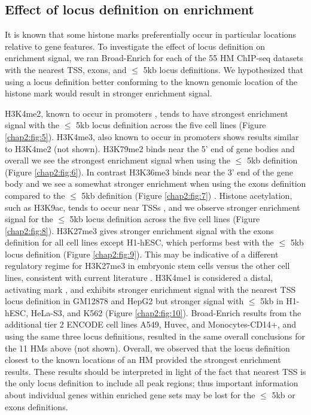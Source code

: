 \subsection{Effect of locus definition on enrichment}
\label{broad_results_locus}

It is known that some histone marks preferentially occur in particular locations relative to gene features. To investigate the effect of locus definition on enrichment signal, we ran Broad-Enrich for each of the 55 HM ChIP-seq datasets with the nearest TSS, exons, and $\leq$ 5kb locus definitions. We hypothesized that using a locus definition better conforming to the known genomic location of the histone mark would result in stronger enrichment signal.

H3K4me2, known to occur in promoters \cite{Pekowska:2010hk}, tends to have strongest enrichment signal with the $\leq$ 5kb locus definition across the five cell lines (Figure \ref{chap2:fig:5}). H3K4me3, also known to occur in promoters \cite{Bernstein:2006ip} shows results similar to H3K4me2 (not shown). H3K79me2 binds near the 5' end of gene bodies and overall we see the strongest enrichment signal when using the $\leq$ 5kb definition (Figure \ref{chap2:fig:6}). In contrast H3K36me3 binds near the 3' end of the gene body and we see a somewhat stronger enrichment when using the exons definition compared to the $\leq$ 5kb definition (Figure \ref{chap2:fig:7}) \cite{Barth:2010jc, ENCODEProjectConsortium:2012gc}. Histone acetylation, such as H3K9ac, tends to occur near TSSs \cite{Barth:2010jc}, and we observe stronger enrichment signal for the $\leq$ 5kb locus definition across the five cell lines (Figure \ref{chap2:fig:8}). H3K27me3 gives stronger enrichment signal with the exons definition for all cell lines except H1-hESC, which performs best with the $\leq$ 5kb locus definition (Figure \ref{chap2:fig:9}). This may be indicative of a different regulatory regime for H3K27me3 in embryonic stem cells versus the other cell lines, consistent with current literature \cite{Xie:2013fk}. H3K4me1 is considered a distal, activating mark \cite{Dong:2012di}, and exhibits stronger enrichment signal with the nearest TSS locus definition in GM12878 and HepG2 but stronger signal with $\leq$ 5kb in H1-hESC, HeLa-S3, and K562 (Figure \ref{chap2:fig:10}). Broad-Enrich results from the additional tier 2 ENCODE cell lines A549, Huvec, and Monocytes-CD14+, and using the same three locus definitions, resulted in the same overall conclusions for the 11 HMs above (not shown). Overall, we observed that the locus definition closest to the known locations of an HM provided the strongest enrichment results. These results should be interpreted in light of the fact that nearest TSS is the only locus definition to include all peak regions; thus important information about individual genes within enriched gene sets may be lost for the $\leq$ 5kb or exons definitions.

